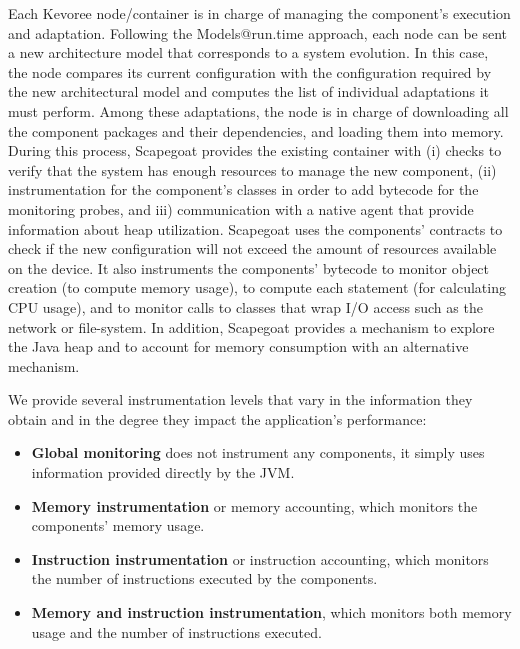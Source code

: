 Each Kevoree node/container is in charge of managing the component's execution and adaptation.
Following the Models@run.time approach, each node can be sent a new architecture model that corresponds to a system evolution.
In this case, the node compares its current configuration with the configuration required by the new architectural model and computes the list of individual adaptations it must perform.
Among these adaptations, the node is in charge of downloading all the component packages and their dependencies, and loading them into memory.
During this process, Scapegoat provides the existing container with (i) checks to verify that the system has enough resources to manage the new component, (ii) instrumentation for the component's classes in order to add bytecode for the monitoring probes, and iii) communication with a native agent that provide information about heap utilization.
Scapegoat uses the components' contracts to check if the new configuration will not exceed the amount of resources available on the device.
It also instruments the components' bytecode to monitor object creation (to compute memory usage), to compute each statement (for calculating CPU usage), and to monitor calls to classes that wrap I/O access such as the network or file-system.
In addition, Scapegoat provides a mechanism to explore the Java heap and to account for memory consumption with an alternative mechanism.

We provide several instrumentation levels that vary in the information they obtain and in the degree they impact the application's performance:
\begin{itemize}
\leftskip -.2in
	\item \textbf{Global monitoring} does not instrument any components, it simply uses information provided directly by the JVM.
	\item \textbf{Memory instrumentation} or memory accounting, which monitors the components' memory usage.
	\item \textbf{Instruction instrumentation} or instruction accounting, which monitors the number of instructions executed by the components.
	\item \textbf{Memory and instruction instrumentation}, which monitors both memory usage and the number of instructions executed.	
\end{itemize}

